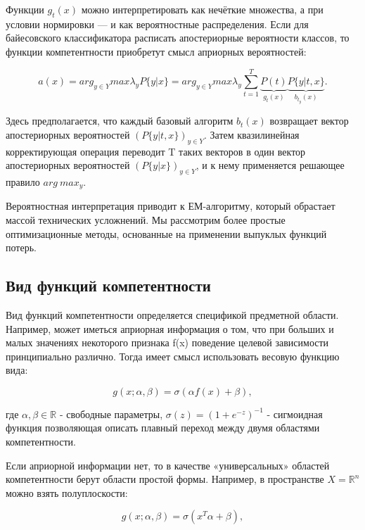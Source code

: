 Функции $g_{t}(x)$ можно интерпретировать как
нечёткие множества, а при условии нормировки — и как вероятностные распределения. Если для байесовского классификатора расписать апостериорные вероятности
классов, то функции компетентности приобретут смысл априорных вероятностей:

\begin{equation*}
    a(x) = arg_{y\in Y} max \lambda_{y} P\{y|x\} = arg_{y\in Y} max \lambda_{y} \sum_{t=1}^{T} \underbrace{P(t)}_{g_{t}(x)} \underbrace{P\{y|t, x\}}_{b_{t_{y}}(x)}.
\end{equation*}

Здесь предполагается, что каждый базовый алгоритм $b_{t}(x)$ возвращает вектор апостериорных вероятностей $(P\{y|t, x\})_{y\in Y}$. Затем квазилинейная корректирующая операция переводит T таких векторов в один вектор апостериорных вероятностей $(P\{y| x\})_{y\in Y}$, и к нему применяется решающее правило $arg\:max_{y}$.


Вероятностная интерпретация приводит к ЕМ-алгоритму, который обрастает массой технических усложнений. Мы рассмотрим более простые оптимизационные методы, основанные на применении выпуклых функций потерь.

\subsection{Вид функций компетентности}


Вид функций компетентности определяется спецификой предметной области. Например, может иметься априорная информация о том, что при больших и малых значениях некоторого признака f(x) поведение целевой зависимости принципиально различно. Тогда имеет смысл использовать весовую функцию вида:

\begin{equation*}
    g(x;\alpha, \beta) = \sigma(\alpha f(x) + \beta),
\end{equation*}

где $\alpha, \beta \in \mathbb{R}$ - свободные параметры, $\sigma(z) = (1 + e^{-z})^{-1}$ - сигмоидная функция позволяющая описать плавный переход между двумя областями компетентности.


Если априорной информации нет, то в качестве «универсальных» областей компетентности берут области простой формы. Например, в пространстве $X = \mathbb{R}^{n}$ можно взять полуплоскости:

\begin{equation*}
    g(x;\alpha, \beta) = \sigma(x^{T}\alpha + \beta),
\end{equation*}


